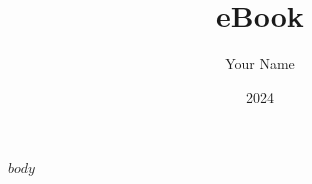 \documentclass[
  12pt, %
  a4paper, %
]{book}
\title{eBook} %
\author{Your Name} %
\date{2024\\}
\begin{document}
\maketitle

\renewcommand{\contentsname}{Table of Contents} %
\setcounter{tocdepth}{2} %
\tableofcontents

$body$
\end{document}
